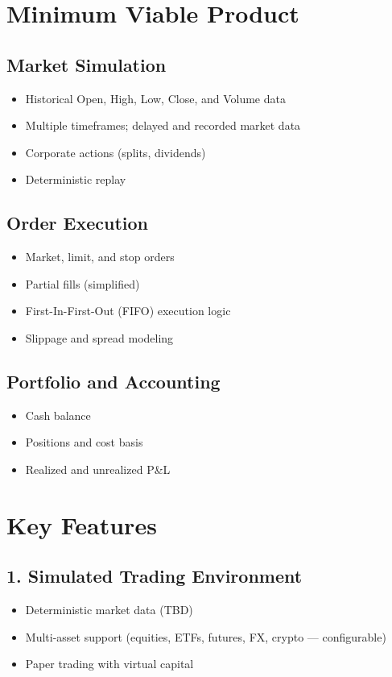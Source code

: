 \documentclass[12pt]{article}
\begin{document}
\section*{Minimum Viable Product}

\subsection*{Market Simulation}
\begin{itemize}
    \item Historical Open, High, Low, Close, and Volume data
    \item Multiple timeframes; delayed and recorded market data
    \item Corporate actions (splits, dividends)
    \item Deterministic replay
\end{itemize}

\subsection*{Order Execution}
\begin{itemize}
    \item Market, limit, and stop orders
    \item Partial fills (simplified)
    \item First-In-First-Out (FIFO) execution logic
    \item Slippage and spread modeling
\end{itemize}

\subsection*{Portfolio and Accounting}
\begin{itemize}
    \item Cash balance
    \item Positions and cost basis
    \item Realized and unrealized P\&L
\end{itemize}

\section*{Key Features}

\subsection*{1. Simulated Trading Environment}
\begin{itemize}
    \item Deterministic market data (TBD)
    \item Multi-asset support (equities, ETFs, futures, FX, crypto — configurable)
    \item Paper trading with virtual capital
\end{itemize}
\end{document}
